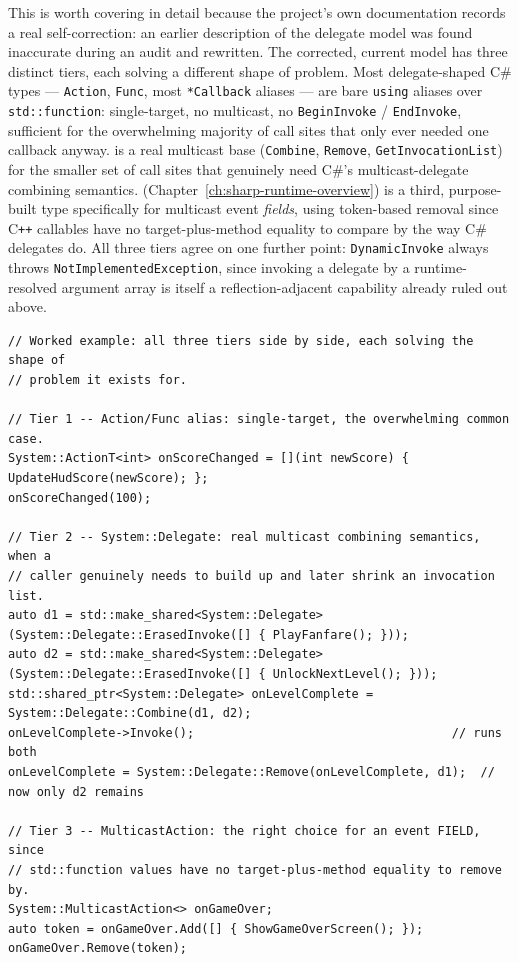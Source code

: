 This is worth covering in detail because the project's own documentation records a real
self-correction: an earlier description of the delegate model was found inaccurate during an
audit and rewritten. The corrected, current model has three distinct tiers, each solving a
different shape of problem. Most delegate-shaped C\# types --- \texttt{Action},
\texttt{Func}, most \texttt{*Callback} aliases --- are bare \texttt{using} aliases over
\texttt{std::function}: single-target, no multicast, no \texttt{BeginInvoke} /
\texttt{EndInvoke}, sufficient for the overwhelming majority of call sites that only ever
needed one callback anyway.  is a real multicast base
(\texttt{Combine}, \texttt{Remove}, \texttt{GetInvocationList}) for the smaller set of call
sites that genuinely need C\#'s multicast-delegate combining semantics.
 (Chapter~\ref{ch:sharp-runtime-overview}) is a
third, purpose-built type specifically for multicast event \emph{fields}, using
token-based removal since C\texttt{++} callables have no target-plus-method equality to
compare by the way C\# delegates do. All three tiers agree on one further point:
\texttt{DynamicInvoke} always throws \texttt{NotImplementedException}, since invoking a
delegate by a runtime-resolved argument array is itself a reflection-adjacent capability
already ruled out above.

\begin{lstlisting}
// Worked example: all three tiers side by side, each solving the shape of
// problem it exists for.

// Tier 1 -- Action/Func alias: single-target, the overwhelming common case.
System::ActionT<int> onScoreChanged = [](int newScore) { UpdateHudScore(newScore); };
onScoreChanged(100);

// Tier 2 -- System::Delegate: real multicast combining semantics, when a
// caller genuinely needs to build up and later shrink an invocation list.
auto d1 = std::make_shared<System::Delegate>(System::Delegate::ErasedInvoke([] { PlayFanfare(); }));
auto d2 = std::make_shared<System::Delegate>(System::Delegate::ErasedInvoke([] { UnlockNextLevel(); }));
std::shared_ptr<System::Delegate> onLevelComplete = System::Delegate::Combine(d1, d2);
onLevelComplete->Invoke();                                    // runs both
onLevelComplete = System::Delegate::Remove(onLevelComplete, d1);  // now only d2 remains

// Tier 3 -- MulticastAction: the right choice for an event FIELD, since
// std::function values have no target-plus-method equality to remove by.
System::MulticastAction<> onGameOver;
auto token = onGameOver.Add([] { ShowGameOverScreen(); });
onGameOver.Remove(token);
\end{lstlisting}

